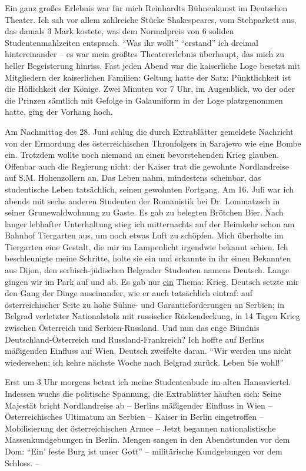 \documentclass[a5paper,pagesize,10pt,twoside=true]{scrbook}
\renewcommand{\marginpar}[2][]{}
\begin{document}
\marginpar{167}
Ein ganz großes Erlebnis war für mich Reinhardts Bühnenkunst im Deutschen Theater. Ich sah vor allem zahlreiche Stücke Shakespeares, vom Stehparkett aus, das damals 3 Mark kostete, was dem Normalpreis von 6 soliden Studentenmahlzeiten entsprach. \enquote{Was ihr wollt} \enquote{erstand} ich dreimal hintereinander -- es war mein größtes Theatererlebnis überhaupt, das mich zu heller Begeisterung hinriss. Fast jeden Abend war die kaiserliche Loge besetzt mit Mitgliedern der kaiserlichen Familien: Geltung hatte der Satz: Pünktlichkeit ist die Höflichkeit der Könige. Zwei Minuten vor 7 Uhr, im Augenblick, wo der oder die Prinzen sämtlich mit Gefolge in Galauniform in der Loge platzgenommen hatte, ging der Vorhang hoch.

Am Nachmittag des 28. Juni schlug die durch Extrablätter gemeldete Nachricht von der Ermordung des österreichischen Thronfolgers in Sarajewo wie eine Bombe ein. Trotzdem wollte noch niemand an einen bevorstehenden Krieg glauben. Offenbar auch die Regierung nicht: der Kaiser trat die gewohnte Nordlandreise auf S.M. Hohenzollern an. Das Leben nahm, mindestens scheinbar, das studentische Leben tatsächlich, seinen gewohnten Fortgang.
Am 16. Juli war ich abends mit sechs anderen Studenten der Romanistik bei Dr. Lommatzsch in seiner Grunewaldwohnung zu Gaste. Es gab zu belegten Brötchen Bier. Nach langer lebhafter Unterhaltung stieg ich mitternachts auf der Heimkehr schon am Bahnhof Tiergarten aus, um noch etwas Luft zu schöpfen. Mich überholte im Tiergarten eine Gestalt, die mir im Lampenlicht irgendwie bekannt schien. Ich beschleunigte meine Schritte, holte sie ein und erkannte in ihr einen Bekannten aus Dijon, den serbisch-jüdischen Belgrader Studenten namens Deutsch. Lange gingen wir im Park auf und ab. Es gab nur \underline{ein} Thema: Krieg. Deutsch setzte mir den Gang der Dinge auseinander, wie er auch tatsächlich eintraf: auf österreichischer Seite zu hohe Sühne- und Garantieforderungen an Serbien; in Belgrad verletzter Nationalstolz mit russischer Rückendeckung, in 14 Tagen Krieg zwischen Österreich und Serbien-Russland. Und nun das enge Bündnis Deutschland-Österreich und Russland-Frankreich? Ich hoffte auf Berlins mäßigenden Einfluss auf Wien. Deutsch zweifelte daran. \enquote{Wir werden uns nicht wiedersehen; ich kehre nächste Woche nach Belgrad zurück. Leben Sie wohl!}

Erst um 3 Uhr morgens betrat ich meine Studentenbude im alten Hansaviertel. Indessen wuchs die politische Spannung, die Extrablätter häuften sich: Seine Majestät bricht Nordlandreise ab -- Berlins mäßigender Einfluss in Wien -- Österreichisches Ultimatum an Serbien -- Kaiser in Berlin eingetroffen -- Mobilisierung der österreichischen Armee -- Jetzt begannen nationalistische Massenkundgebungen in Berlin. Mengen sangen in den Abendstunden vor dem Dom: \enquote{Ein' feste Burg ist unser Gott} -- militärische Kundgebungen vor dem Schloss. --
\end{document}
